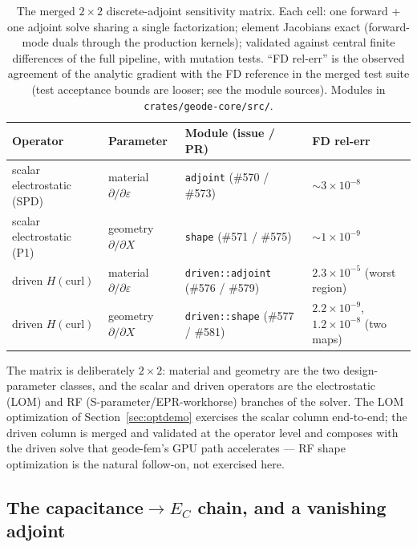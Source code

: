 \documentclass{anvil-paper}
\begin{document}
\begin{table}[t]
  \centering
  \caption{The merged $2\times 2$ discrete-adjoint sensitivity matrix.
  Each cell: one forward + one adjoint solve sharing a single
  factorization; element Jacobians exact (forward-mode duals through the
  production kernels); validated against central finite differences of
  the full pipeline, with mutation tests. ``FD rel-err'' is the observed
  agreement of the analytic gradient with the FD reference in the merged
  test suite (test acceptance bounds are looser; see the module sources).
  Modules in \texttt{crates/geode-core/src/}.}
  \label{tab:adjoint-matrix}
  \footnotesize
  \setlength{\tabcolsep}{4pt}
  \begin{tabular}{@{}llll@{}}
    \toprule
    Operator & Parameter & Module (issue / PR) & FD rel-err \\
    \midrule
    scalar electrostatic (SPD) & material $\partial/\partial\varepsilon$ &
      \texttt{adjoint} (\#570 / \#573) & ${\sim}3\times10^{-8}$ \\
    scalar electrostatic (P1) & geometry $\partial/\partial X$ &
      \texttt{shape} (\#571 / \#575) & ${\sim}1\times10^{-9}$ \\
    driven $H(\mathrm{curl})$ & material $\partial/\partial\varepsilon$ &
      \texttt{driven::adjoint} (\#576 / \#579) & $2.3\times10^{-5}$ (worst region) \\
    driven $H(\mathrm{curl})$ & geometry $\partial/\partial X$ &
      \texttt{driven::shape} (\#577 / \#581) & $2.2\times10^{-9}$, $1.2\times10^{-8}$ (two maps) \\
    \bottomrule
  \end{tabular}
\end{table}

The matrix is deliberately $2\times 2$: material and geometry are the two
design-parameter classes, and the scalar and driven operators are the
electrostatic (LOM) and RF (S-parameter/EPR-workhorse) branches of the
solver. The LOM optimization of Section~\ref{sec:optdemo} exercises the
scalar column end-to-end; the driven column is merged and validated at
the operator level and composes with the driven solve that geode-fem's
GPU path accelerates --- RF shape optimization is the natural follow-on,
not exercised here.

\subsection{The \texorpdfstring{capacitance$\to E_C$}{capacitance-to-E\_C} chain, and a vanishing adjoint}
\label{sec:chain}
\end{document}
